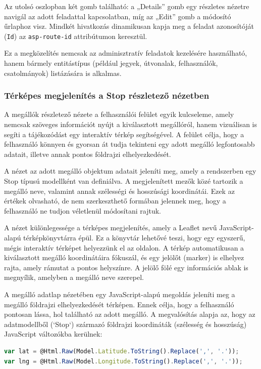 Az utolsó oszlopban két gomb található: a „Details” gomb egy részletes nézetre navigál az adott feladattal kapcsolatban, míg az „Edit” gomb a módosító űrlaphoz visz. Mindkét hivatkozás dinamikusan kapja meg a feladat azonosítóját (\texttt{Id}) az \texttt{asp-route-id} attribútumon keresztül.

Ez a megközelítés nemcsak az adminisztratív feladatok kezelésére használható, hanem bármely entitástípus (például jegyek, útvonalak, felhasználók, csatolmányok) listázására is alkalmas. 


\subsubsection{Térképes megjelenítés a Stop részletező nézetben}
A megállók részletező nézete a felhasználói felület egyik kulcseleme, amely nemcsak szöveges információt nyújt a kiválasztott megállóról, hanem vizuálisan is segíti a tájékozódást egy interaktív térkép segítségével. A felület célja, hogy a felhasználó könnyen és gyorsan át tudja tekinteni egy adott megálló legfontosabb adatait, illetve annak pontos földrajzi elhelyezkedését.

A nézet az adott megálló objektum adatait jeleníti meg, amely a rendszerben egy Stop típusú modellként van definiálva. A megjelenített mezők közé tartozik a megálló neve, valamint annak szélességi és hosszúsági koordinátái. Ezek az értékek olvasható, de nem szerkeszthető formában jelennek meg, hogy a felhasználó ne tudjon véletlenül módosítani rajtuk.

A nézet különlegessége a térképes megjelenítés, amely a Leaflet nevű JavaScript-alapú térképkönyvtárra épül. Ez a könyvtár lehetővé teszi, hogy egy egyszerű, mégis interaktív térképet helyezzünk el az oldalon. A térkép automatikusan a kiválasztott megálló koordinátáira fókuszál, és egy jelölőt (marker) is elhelyez rajta, amely rámutat a pontos helyszínre. A jelölő fölé egy információs ablak is megnyílik, amelyben a megálló neve szerepel.

A megálló adatlap nézetében egy JavaScript-alapú megoldás jeleníti meg a megálló földrajzi elhelyezkedését térképen. Ennek célja, hogy a felhasználó pontosan lássa, hol található az adott megálló. A megvalósítás alapja az, hogy az adatmodellből (`Stop`) származó földrajzi koordináták (szélesség és hosszúság) JavaScript változókba kerülnek:

\begin{lstlisting}[language=JavaScript]
var lat = @Html.Raw(Model.Latitude.ToString().Replace(',', '.'));
var lng = @Html.Raw(Model.Longitude.ToString().Replace(',', '.'));
\end{lstlisting}

